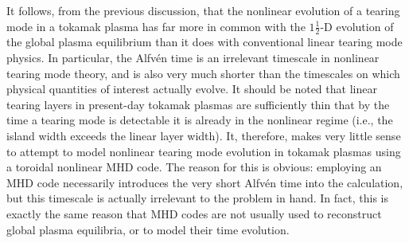 \documentclass[12pt,prb,aps]{revtex4-1}
\begin{document}
It follows, from the previous discussion, that the nonlinear evolution of a tearing mode in a tokamak plasma has far more in common with the $1\tfrac{1}{2}$-D
evolution of the global plasma equilibrium than it does with
conventional linear tearing mode physics. In particular, the Alfv\'{e}n time is
an irrelevant timescale in nonlinear tearing mode theory, and
is also  very much shorter than the timescales on which
physical quantities of interest actually evolve. It should be noted that linear tearing layers in present-day tokamak plasmas are sufficiently thin that by the time a tearing mode is detectable it is already in the nonlinear regime (i.e., the island width exceeds the linear layer width).\cite{wesson} It, therefore, makes very little sense to
attempt to model nonlinear tearing mode evolution in tokamak plasmas using a toroidal nonlinear MHD code. The reason for this is obvious: employing  an MHD code necessarily introduces the very short Alfv\'{e}n time into the calculation,
but this timescale is actually irrelevant to the problem in hand. In fact, this is exactly the same reason that MHD codes are not usually used to reconstruct global plasma equilibria, or to model their time evolution.
\end{document}
